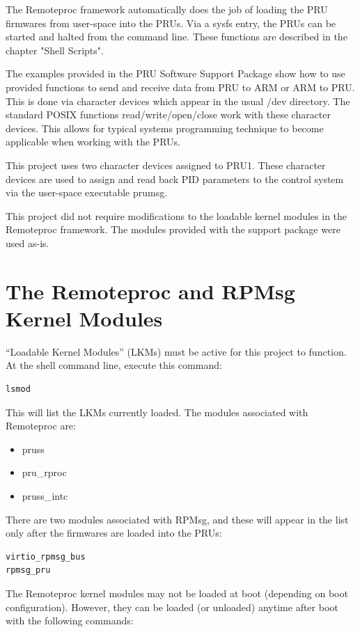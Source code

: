 The Remoteproc framework automatically does the job of loading the PRU firmwares from user-space into the PRUs.  Via a sysfs entry, the PRUs can be started and halted from the command line.  These functions are described in the chapter "Shell Scripts".

The examples provided in the PRU Software Support Package show how to use provided functions to send and receive data from PRU to ARM or ARM to PRU.  This is done via character devices which appear in the usual /dev directory.  The standard POSIX functions read/write/open/close work with these character devices.  This allows for typical systems programming technique to become applicable when working with the PRUs.

This project uses two character devices assigned to PRU1.  These character devices are used to assign and read back PID parameters to the control system via the user-space executable prumsg.

This project did not require modifications to the loadable kernel modules in the Remoteproc framework.  The modules provided with the support package were used as-is.

\section{The Remoteproc and RPMsg Kernel Modules}

``Loadable Kernel Modules'' (LKMs) must be active for this project to function.
At the shell command line, execute this command:

\begin{verbatim}
lsmod
\end{verbatim}

This will list the LKMs currently loaded.  The modules associated with Remoteproc are:

\begin{itemize}
\item pruss
\item pru\_rproc
\item pruss\_intc
\end{itemize}

There are two modules associated with RPMsg, and these will appear in the list only after the firmwares are loaded into the PRUs:

\begin{verbatim}
virtio_rpmsg_bus
rpmsg_pru
\end{verbatim}

The Remoteproc kernel modules may not be loaded at boot (depending on boot configuration).  However, they can be loaded (or unloaded) anytime after boot with the following commands:

